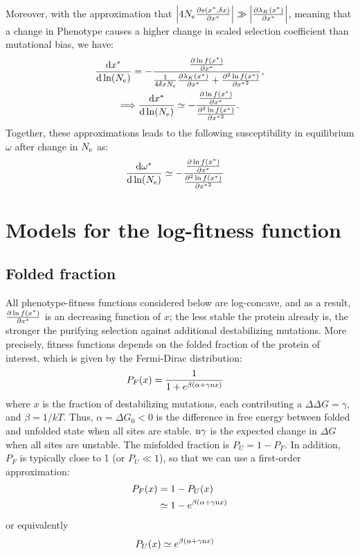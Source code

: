 Moreover, with the approximation that $\left| 4 N_{\mathrm{e}} \frac{ \partial s(x^{*}, \delta x) }{\partial x^{*} } \right| \gg \left| \frac{\partial \lambda_K (x^{*}) }{\partial x^{*} } \right|$, meaning that a change in \gls{Phenotype} causes a higher change in scaled selection coefficient than mutational bias, we have:
\begin{gather}
\frac{ \mathrm{d} x^{*}}{\mathrm{d} \ln (N_{\mathrm{e}})}  = - \frac{\frac{ \partial \ln f(x^{*}) }{\partial {x^{*}}}}{\frac{1}{4 \delta x N_{\mathrm{e}}} \frac{\partial \lambda_K (x^{*}) }{\partial x^{*} } + \frac{ \partial^2 \ln f(x^{*}) }{\partial {x^{*}}^2}},\\
\Longrightarrow \frac{ \mathrm{d} x^{*}}{\mathrm{d} \ln (N_{\mathrm{e}})}  \simeq - \frac{\frac{ \partial \ln f(x^{*}) }{\partial {x^{*}}}}{\frac{ \partial^2 \ln f(x^{*}) }{\partial {x^{*}}^2}}. \label{eq:approx_dx_dlnNe}
\end{gather}
Together, these approximations leads to the following susceptibility in equilibrium $\omega$ after change in $N_{\mathrm{e}}$ as:
\begin{align}
\frac{ \mathrm{d} \omega^{*}}{\mathrm{d} \ln (N_{\mathrm{e}})} & \simeq - \frac{\frac{ \partial \ln f(x^{*}) }{\partial {x^{*}}}}{\frac{ \partial^2 \ln f(x^{*}) }{\partial {x^{*}}^2}}\label{eq:approx_dw_dlnNe}
\end{align}
\section{Models for the log-fitness function}
\subsection{Folded fraction}
All phenotype-fitness functions considered below are log-concave, and as a result, $\frac{ \partial \ln f(x^{*}) }{\partial {x^{*}}}$ is an decreasing function of $x$; the less stable the protein already is, the stronger the purifying selection against additional destabilizing mutations. More precisely, fitness functions depends on the folded fraction of the protein of interest, which is given by the Fermi-Dirac distribution:
\begin{align}
P_{F} (x) & = \frac{1}{1 + e^{\beta(\alpha + \gamma \text{n} x)}}
\end{align}
where $x$ is the fraction of destabilizing mutations, each contributing a $\Delta \Delta G = \gamma$, and $\beta = 1 / kT$. Thus, $\alpha = \Delta G_0 < 0$ is the difference in free energy between folded and unfolded state when all sites are stable. $\text{n} \gamma$ is the expected change in $\Delta G$ when all sites are unstable. The misfolded fraction is  $P_{U} = 1-P_{F}$. In addition, $P_{F}$ is typically close to 1 (or $P_{U} \ll 1$), so that we can use a first-order approximation:
\begin{align}
P_{F}(x) & = 1 - P_{U}(x) \\
& \simeq 1 - e^{\beta(\alpha + \gamma \text{n} x)}
\end{align}
or equivalently
\begin{align}
P_{U}(x) & \simeq e^{\beta(\alpha + \gamma \text{n} x)}
\end{align}
